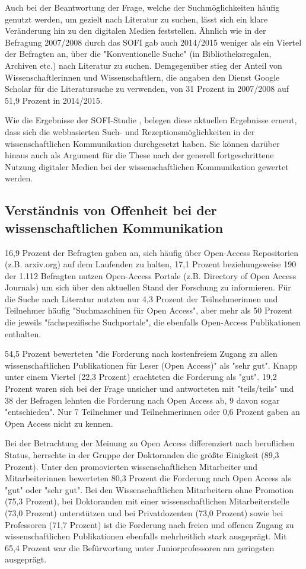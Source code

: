 Auch bei der Beantwortung der Frage, welche der Suchmöglichkeiten häufig genutzt werden, um gezielt nach Literatur zu suchen, lässt sich ein klare Veränderung hin zu den digitalen Medien feststellen. Ähnlich wie in der Befragung 2007/2008 durch das SOFI gab auch 2014/2015 weniger als ein Viertel der Befragten an, über die "Konventionelle Suche" (in Bibliotheksregalen, Archiven etc.) nach Literatur zu suchen. Demgegenüber stieg der Anteil von Wissenschaftlerinnen und Wissenschaftlern, die angaben den Dienst Google Scholar für die Literatursuche zu verwenden, von 31 Prozent in 2007/2008 auf 51,9 Prozent in 2014/2015.

Wie die Ergebnisse der SOFI-Studie \cite{Hanekop_2014}, belegen diese aktuellen Ergebnisse erneut, dass sich die webbasierten Such- und Rezeptionsmöglichkeiten in der wissenschaftlichen Kommunikation durchgesetzt haben. Sie können darüber hinaus auch als Argument für die These nach der generell fortgeschrittene Nutzung digitaler Medien bei der wissenschaftlichen Kommunikation gewertet werden.

\subsection{Verständnis von Offenheit bei der wissenschaftlichen Kommunikation}

16,9 Prozent der Befragten gaben an, sich häufig über Open-Access Repositorien (z.B. arxiv.org) auf dem Laufenden zu halten, 17,1 Prozent beziehungsweise 190 der 1.112 Befragten nutzen Open-Access Portale (z.B. Directory of Open Access Journals) um sich über den aktuellen Stand der Forschung zu informieren. Für die Suche nach Literatur nutzten nur 4,3 Prozent der Teilnehmerinnen und Teilnehmer häufig "Suchmaschinen für Open Access", aber mehr als 50 Prozent die jeweils "fachspezifische Suchportale", die ebenfalls Open-Access Publikationen enthalten.

54,5 Prozent bewerteten "die Forderung nach kostenfreiem Zugang zu allen wissenschaftlichen Publikationen für Leser (Open Access)" als "sehr gut". Knapp unter einem Viertel (22,3 Prozent) erachteten die Forderung als "gut". 19,2 Prozent waren sich bei der Frage unsicher und antworteten mit "teils/teils" und 38 der Befragen lehnten die Forderung nach Open Access ab, 9 davon sogar "entschieden". Nur 7 Teilnehmer und Teilnehmerinnen oder 0,6 Prozent gaben an Open Access nicht zu kennen.

Bei der Betrachtung der Meinung zu Open Access differenziert nach beruflichen Status, herrschte in der Gruppe der Doktoranden die größte Einigkeit (89,3 Prozent). Unter den promovierten wissenschaftlichen Mitarbeiter und Mitarbeiterinnen bewerteten 80,3 Prozent die Forderung nach Open Access als "gut" oder "sehr gut". Bei den Wissenschaftlichen Mitarbeitern ohne Promotion (75,3 Prozent), bei Doktoranden mit einer wissenschaftlichen Mitarbeiterstelle (73,0 Prozent) unterstützen und bei Privatdozenten (73,0 Prozent) sowie bei Professoren (71,7 Prozent) ist die Forderung nach freien und offenen Zugang zu wissenschaftlichen Publikationen ebenfalls mehrheitlich stark ausgeprägt. Mit 65,4 Prozent war die Befürwortung unter Juniorprofessoren am geringsten ausgeprägt.


